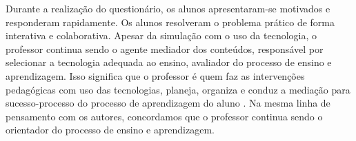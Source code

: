 Durante a realização do questionário, os alunos apresentaram-se
motivados e responderam rapidamente. Os alunos resolveram o problema
prático de forma interativa e colaborativa. Apesar da simulação com o
uso da tecnologia, o professor continua sendo o agente mediador dos
conteúdos, responsável por selecionar a tecnologia adequada ao ensino,
avaliador do processo de ensino e aprendizagem. Isso significa que o
professor é quem faz as intervenções pedagógicas com uso das
tecnologias, planeja, organiza e conduz a mediação para sucesso-processo
do processo de aprendizagem do aluno \cite{zanatta2015}. Na
mesma linha de pensamento com os autores, concordamos que o professor
continua sendo o orientador do processo de ensino e aprendizagem.
